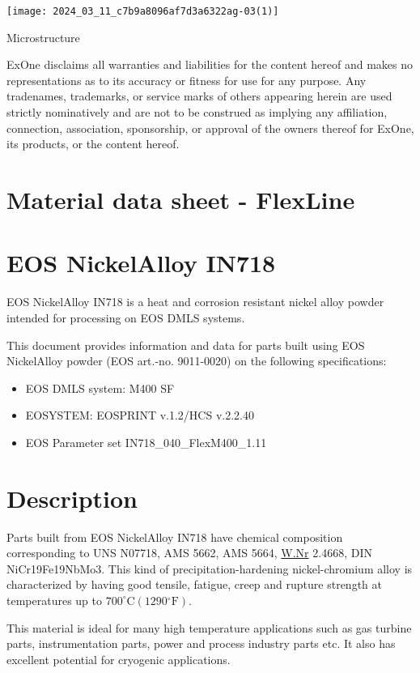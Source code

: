 \documentclass[10pt]{article}
\begin{document}
\begin{center}
\texttt{[image: 2024\_03\_11\_c7b9a8096af7d3a6322ag-03(1)]}
\end{center}

Microstructure

ExOne disclaims all warranties and liabilities for the content hereof and makes no representations as to its accuracy or fitness for use for any purpose. Any tradenames, trademarks, or service marks of others appearing herein are used strictly nominatively and are not to be construed as implying any affiliation, connection, association, sponsorship, or approval of the owners thereof for ExOne, its products, or the content hereof.

\section*{Material data sheet - FlexLine}
\section*{EOS NickelAlloy IN718}
EOS NickelAlloy IN718 is a heat and corrosion resistant nickel alloy powder intended for processing on EOS DMLS systems.

This document provides information and data for parts built using EOS NickelAlloy powder (EOS art.-no. 9011-0020) on the following specifications:

\begin{itemize}
  \item EOS DMLS system: M400 SF
  \item EOSYSTEM: EOSPRINT v.1.2/HCS v.2.2.40
  \item EOS Parameter set IN718\_040\_FlexM400\_1.11
\end{itemize}

\section*{Description}
Parts built from EOS NickelAlloy IN718 have chemical composition corresponding to UNS N07718, AMS 5662, AMS 5664, \href{http://W.Nr}{W.Nr} 2.4668, DIN NiCr19Fe19NbMo3. This kind of precipitation-hardening nickel-chromium alloy is characterized by having good tensile, fatigue, creep and rupture strength at temperatures up to $700^{\circ} \mathrm{C}\left(1290{ }^{\circ} \mathrm{F}\right)$.

This material is ideal for many high temperature applications such as gas turbine parts, instrumentation parts, power and process industry parts etc. It also has excellent potential for cryogenic applications.
\end{document}
